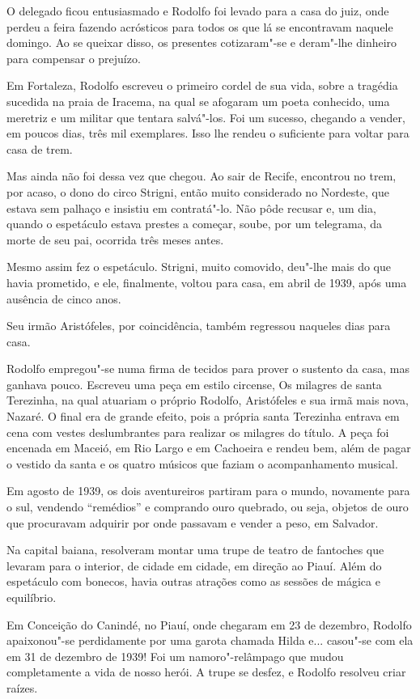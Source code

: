O delegado ficou entusiasmado e Rodolfo foi levado para a casa do juiz,
onde perdeu a feira fazendo acrósticos para todos os que lá se
encontravam naquele domingo. Ao se queixar disso, os presentes
cotizaram"-se e deram"-lhe dinheiro para compensar o prejuízo. 

 Em Fortaleza, Rodolfo escreveu o primeiro cordel de sua vida, sobre a
tragédia sucedida na praia de Iracema, na qual se afogaram um poeta
conhecido, uma meretriz e um militar que tentara salvá"-los. Foi um
sucesso, chegando a vender, em poucos dias, três mil exemplares. Isso
lhe rendeu o suficiente para voltar para casa de trem. 

 Mas ainda não foi dessa vez que chegou. Ao sair de Recife, encontrou no
trem, por acaso, o dono do circo Strigni, então muito considerado no
Nordeste, que estava sem palhaço e insistiu em contratá"-lo. Não pôde
recusar e, um dia, quando o espetáculo estava prestes a começar, soube,
por um telegrama, da morte de seu pai, ocorrida três meses antes. 

 Mesmo assim fez o espetáculo. Strigni, muito comovido, deu"-lhe mais
do que havia prometido, e ele, finalmente, voltou para casa, em abril
de 1939, após uma ausência de cinco anos. 

 Seu irmão Aristófeles, por coincidência, também regressou naqueles dias
para casa. 

 Rodolfo empregou"-se numa firma de tecidos para prover o sustento da
casa, mas ganhava pouco. Escreveu uma peça em estilo circense, Os
milagres de santa Terezinha, na qual atuariam o próprio Rodolfo,
Aristófeles e sua irmã mais nova, Nazaré. O final era de grande efeito,
pois a própria santa Terezinha entrava em cena com vestes deslumbrantes
para realizar os milagres do título. A peça foi encenada em Maceió, em
Rio Largo e em Cachoeira e rendeu bem, além de pagar o vestido da santa
e os quatro músicos que faziam o acompanhamento musical. 

 Em agosto de 1939, os dois aventureiros partiram para o mundo,
novamente para o sul, vendendo ``remédios'' e
comprando ouro quebrado, ou seja, objetos de ouro que procuravam
adquirir por onde passavam e vender a peso, em Salvador. 

 Na capital baiana, resolveram montar uma trupe de teatro de fantoches
que levaram para o interior, de cidade em cidade, em direção ao Piauí.
Além do espetáculo com bonecos, havia outras atrações como as sessões
de mágica e equilíbrio. 

 Em Conceição do Canindé, no Piauí, onde chegaram em 23 de dezembro,
Rodolfo apaixonou"-se perdidamente por uma garota chamada Hilda e...
casou"-se com ela em 31 de dezembro de 1939! Foi um namoro"-relâmpago
que mudou completamente a vida de nosso herói. A trupe se desfez, e
Rodolfo resolveu criar raízes. 

